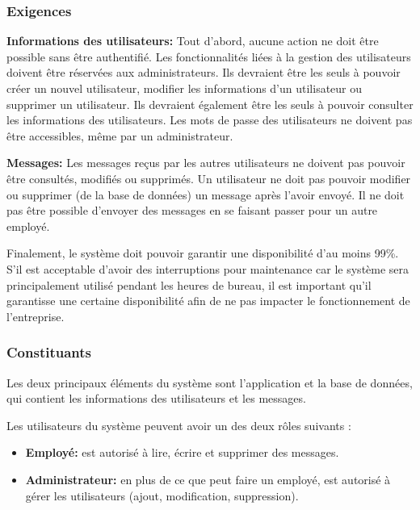 \documentclass{article}
\begin{document}
\subsubsection{Exigences}

\textbf{Informations des utilisateurs:} Tout d'abord, aucune action ne
doit être possible sans être authentifié. Les fonctionnalités liées à la
gestion des utilisateurs doivent être réservées aux administrateurs. Ils
devraient être les seuls à pouvoir créer un nouvel utilisateur, modifier
les informations d'un utilisateur ou supprimer un utilisateur. Ils
devraient également être les seuls à pouvoir consulter les informations
des utilisateurs. Les mots de passe des utilisateurs ne doivent pas être
accessibles, même par un administrateur.

\textbf{Messages:} Les messages reçus par les autres utilisateurs ne
doivent pas pouvoir être consultés, modifiés ou supprimés. Un
utilisateur ne doit pas pouvoir modifier ou supprimer (de la base de
données) un message après l'avoir envoyé. Il ne doit pas être possible
d'envoyer des messages en se faisant passer pour un autre employé.

Finalement, le système doit pouvoir garantir une disponibilité d'au
moins 99\%. S'il est acceptable d'avoir des interruptions pour
maintenance car le système sera principalement utilisé pendant les
heures de bureau, il est important qu'il garantisse une certaine
disponibilité afin de ne pas impacter le fonctionnement de l'entreprise.

\subsubsection{Constituants}

Les deux principaux éléments du système sont l'application et la base de
données, qui contient les informations des utilisateurs et les messages.

Les utilisateurs du système peuvent avoir un des deux rôles suivants :

\begin{itemize}

\item
  \textbf{Employé:} est autorisé à lire, écrire et supprimer des
  messages.
\item
  \textbf{Administrateur:} en plus de ce que peut faire un employé, est
  autorisé à gérer les utilisateurs (ajout, modification, suppression).
\end{itemize}
\end{document}
